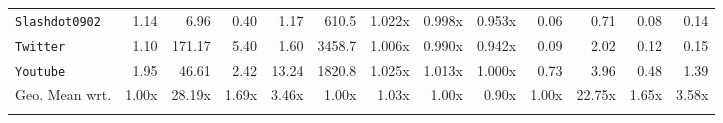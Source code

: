\documentclass[10pt,journal,compsoc]{IEEEtran}
\newcommand\acro{{\sc{HyperFuseR\xspace}\xspace}\xspace}
\begin{document}
\begin{table}
{\begin{tabular}{l|rrrr|rrrr|rrrr}
{\tt Slashdot0902} &       1.14 &    6.96 &   0.40 &  1.17 &      610.5 &  1.022x &  0.998x &  0.953x &       0.06 &  0.71 & 0.08 & 0.14 \\
{\tt Twitter}      &       1.10 &  171.17 &   5.40 &  1.60 &     3458.7 &  1.006x &  0.990x &  0.942x &       0.09 &  2.02 & 0.12 & 0.15 \\
{\tt Youtube}      &       1.95 &   46.61 &   2.42 & 13.24 &     1820.8 &  1.025x &  1.013x &  1.000x &       0.73 &  3.96 & 0.48 & 1.39 \\
\bottomrule
Geo. Mean wrt.&1.00x&28.19x&1.69x&3.46x&1.00x&1.03x&1.00x&0.90x&1.00x&22.75x&1.65x&3.58x \\ \acro
\end{tabular}

    }
    \end{table}
    
\end{document}
